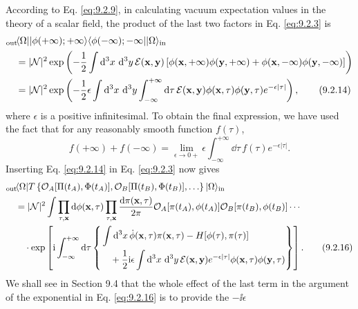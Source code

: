 According to Eq. \eqref{eq:9.2.9}, in calculating vacuum expectation values in the
theory of a scalar field, the product of the last two factors in Eq. \eqref{eq:9.2.3} is
\begin{align}
  &{}_{\mathrm{out}}\!\langle \Omega\rvert\lvert \phi(+\infty);+\infty\rangle
  \langle \phi(-\infty);-\infty\rvert\lvert \Omega\rangle_{\mathrm{in}}
  \notag\\
  &\quad={}|\mathcal{N}|^2\exp\left(-\frac12\int \mathop{}\!\mathrm{d}^3x\,\mathop{}\!\mathrm{d}^3y\,
  \mathcal{E}(\mathbf{x},\mathbf{y})
  \left[\phi(\mathbf{x},+\infty)\phi(\mathbf{y},+\infty)
  +\phi(\mathbf{x},-\infty)\phi(\mathbf{y},-\infty)\right]\right)
  \notag\\
  &\quad={}|\mathcal{N}|^2\exp\left(-\frac12\epsilon
  \int \mathop{}\!\mathrm{d}^3x\,\mathop{}\!\mathrm{d}^3y\int_{-\infty}^{+\infty}\mathop{}\!\mathrm{d}\tau\,
  \mathcal{E}(\mathbf{x},\mathbf{y})
  \phi(\mathbf{x},\tau)\phi(\mathbf{y},\tau)e^{-\epsilon|\tau|}\right),
  \tag{9.2.14}\label{eq:9.2.14}
\end{align}
where $\epsilon$ is a positive infinitesimal. To obtain the final expression,
we have used the fact that for any reasonably smooth function $f(\tau)$,
\begin{equation}
  f(+\infty)+f(-\infty)=\lim_{\epsilon\to0+}\epsilon
  \int_{-\infty}^{+\infty}\dd\tau\,f(\tau)e^{-\epsilon|\tau|}.
  \tag{9.2.15}\label{eq:9.2.15}
\end{equation}
Inserting Eq. \eqref{eq:9.2.14} in Eq. \eqref{eq:9.2.3} now gives
\begin{align}
  &{}_{\mathrm{out}}\!\langle \Omega\rvert T\left\{
  \mathcal{O}_A[\Pi(t_A),\Phi(t_A)],
  \mathcal{O}_B[\Pi(t_B),\Phi(t_B)],\ldots\right\}\lvert \Omega\rangle_{\mathrm{in}}
  \notag\\
  &\quad={}|\mathcal{N}|^2\int
  \prod_{\tau,\mathbf{x}}\mathop{}\!\mathrm{d}\phi(\mathbf{x},\tau)
  \prod_{\tau,\mathbf{x}}\frac{\mathop{}\!\mathrm{d}\pi(\mathbf{x},\tau)}{2\pi}
  \mathcal{O}_A[\pi(t_A),\phi(t_A)]
  \mathcal{O}_B[\pi(t_B),\phi(t_B)]\cdots
  \notag\\
  &\qquad\cdot\exp\left[\mathrm{i}\int_{-\infty}^{+\infty}\mathop{}\!\mathrm{d}\tau
  \left\{\begin{aligned}
  &\int \mathop{}\!\mathrm{d}^3x\,\dot\phi(\mathbf{x},\tau)\pi(\mathbf{x},\tau)
  -H[\phi(\tau),\pi(\tau)]\\
  &\quad+\frac12\mathrm{i}\epsilon\int \mathop{}\!\mathrm{d}^3x\,\mathop{}\!\mathrm{d}^3y\,
  \mathcal{E}(\mathbf{x},\mathbf{y})e^{-\epsilon|\tau|}
  \phi(\mathbf{x},\tau)\phi(\mathbf{y},\tau)
  \end{aligned}\right\}\right].
  \tag{9.2.16}\label{eq:9.2.16}
\end{align}
We shall see in Section 9.4 that the whole effect of the last term in the
argument of the exponential in Eq. \eqref{eq:9.2.16} is to provide the $-\ii\epsilon$
